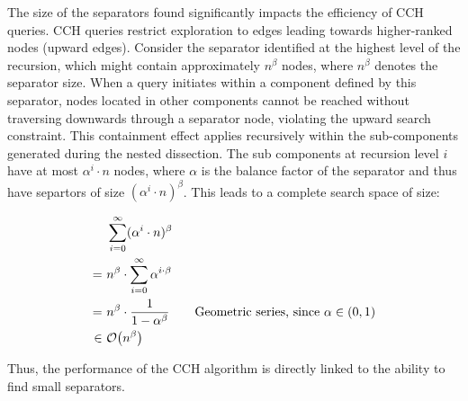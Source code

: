 The size of the separators found significantly impacts the efficiency of CCH queries.
CCH queries restrict exploration to edges leading towards higher-ranked nodes (upward edges).
Consider the separator identified at the highest level of the recursion, which might contain approximately \(n^\beta\) nodes, where \(n^\beta\) denotes the separator size.
When a query initiates within a component defined by this separator, nodes located in other components cannot be reached without traversing downwards through a separator node, violating the upward search constraint.
This containment effect applies recursively within the sub-components generated during the nested dissection.
The sub components at recursion level \(i\) have at most \(\alpha^i\cdot n\) nodes, where \(\alpha\) is the balance factor of the separator and thus have separtors of size \((\alpha^i\cdot n)^\beta\).
This leads to a complete search space of size:

\begin{align*}
	    &~\sum_{i=0}^{\infty} (\alpha^i\cdot n)^\beta \\
	=   &~n^\beta \cdot \sum_{i=0}^{\infty} \alpha^{i\cdot \beta} \\
	=   &~n^\beta \cdot \frac{1}{1 - \alpha^\beta} \qquad \text{Geometric series, since \(\alpha \in (0,1)\)} \\
	\in &~\mathcal{O}\!\left(n^\beta\right)
\end{align*}

Thus, the performance of the CCH algorithm is directly linked to the ability to find small separators.
